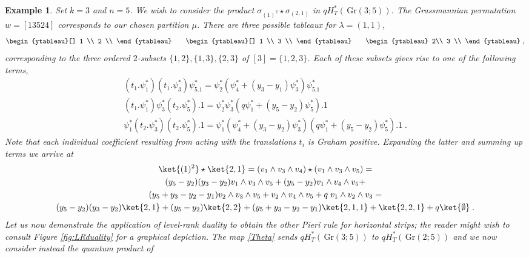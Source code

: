 \documentclass[12pt]{amsart}
\newcommand{\Gr}{\,\mathrm{Gr}}
\newtheorem{example}[prop]{Example}
\numberwithin{equation}{section}
\numberwithin{figure}{section}
\begin{document}
\begin{example}\label{ex:LRduality}
\rm 
    Set $k=3$ and $n=5$. We wish to consider the product $\sigma_{(1)^2}\star\sigma_{(2,1)}$ in $qH^*_T(\Gr(3;5))$. The Grassmannian permutation $w=[13524]$ corresponds to our chosen partition $\mu$. There are three possible tableaux for $\lambda=(1,1)$,
    \[
    \begin{ytableau}[]
    1 \\ 2 \\   
    \end{ytableau}  \qquad
    \begin{ytableau}[]
    1 \\ 3 \\   
    \end{ytableau}\qquad
    \begin{ytableau}
        2\\
        3 \\
    \end{ytableau}\;,
    \]
    corresponding to the three ordered $2$-subsets $\{1,2\},\{1,3\},\{2,3\}$ of $[3]=\{1,2,3\}$. Each of these subsets gives rise to one of the following terms,
    \begin{gather*}
        (t_1.\psi^*_1)(t_1.\psi^*_3)\psi^*_5.1=
        \psi^*_2(\psi^*_4+(y_3-y_1)\psi^*_3)\psi^*_5.1\\
        (t_1.\psi^*_1)\psi^*_3(t_2.\psi^*_5).1=
        \psi^*_2\psi^*_3(q\psi^*_1+(y_5-y_2)\psi^*_5).1\\
        \psi^*_1(t_2.\psi^*_3)(t_2.\psi^*_5).1=
        \psi^*_1(\psi^*_4+(y_3-y_2)\psi^*_3)(q\psi^*_1+(y_5-y_2)\psi^*_5).1\;.
    \end{gather*}
    Note that each individual coefficient resulting from acting with the translations $t_i$ is Graham positive. 
    Expanding the latter and summing up terms we arrive at
    \begin{multline*}
         \ket{(1)^2}\star\ket{2,1}=(v_1\wedge v_3\wedge v_4)\star(v_1\wedge v_3\wedge v_5)=\\
         (y_5-y_2)(y_3-y_2)v_1\wedge v_3\wedge v_5+(y_5-y_2)v_1\wedge v_4\wedge v_5+\\
         (y_5+y_3-y_2-y_1)v_2\wedge v_3\wedge v_5+
         v_2\wedge v_4\wedge v_5+q\; v_1\wedge v_2\wedge v_3=\\
         (y_5-y_2)(y_3-y_2)\ket{2,1}+(y_5-y_2)\ket{2,2}+(y_5+y_3-y_2-y_1)\ket{2,1,1}+\ket{2,2,1}+q\ket{\emptyset}\;.
    \end{multline*}
    Let us now demonstrate the application of level-rank duality to obtain the other Pieri rule for horizontal strips; the reader might wish to consult Figure \ref{fig:LRduality} for a graphical depiction. The map \eqref{Theta} sends $qH^*_T(\Gr(3;5))$ to $qH^*_T(\Gr(2;5))$ and we now consider instead the quantum product of 

\end{example}
\end{document}
